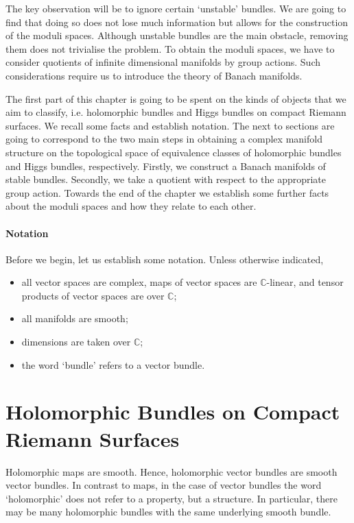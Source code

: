 \documentclass[12pt]{ociamthesis}  %
\begin{document}
The key observation will be to ignore certain `unstable' bundles. We
are going to find that doing so does not lose much information but
allows for the construction of the moduli spaces. Although unstable
bundles are the main obstacle, removing them does not trivialise the
problem. To obtain the moduli spaces, we have to consider quotients
of infinite dimensional manifolds by group actions. Such considerations
require us to introduce the theory of Banach manifolds.

The first part of this chapter is going to be spent on the kinds of
objects that we aim to classify, i.e. holomorphic bundles and Higgs
bundles on compact Riemann surfaces. We recall some facts and establish
notation. The next to sections are going to correspond to the two
main steps in obtaining a complex manifold structure on the topological
space of equivalence classes of holomorphic bundles and Higgs bundles,
respectively. Firstly, we construct a Banach manifolds of stable
bundles. Secondly, we take a quotient with respect to the appropriate
group action. Towards the end of the chapter we establish some
further facts about the moduli spaces and how they relate to each other.

\paragraph*{Notation}

Before we begin, let us establish some notation. Unless otherwise
indicated,

\begin{itemize}
  \item all vector spaces are complex, maps of vector spaces are
    $\mathbb{C}$-linear, and tensor products of vector spaces are
    over $\mathbb{C}$;
  \item all manifolds are smooth;
  \item dimensions are taken over $\mathbb{C}$;
  \item the word `bundle' refers to a vector bundle.
\end{itemize}

\section{Holomorphic Bundles on Compact Riemann Surfaces}

Holomorphic maps are smooth. Hence, holomorphic vector bundles
are smooth vector bundles. In contrast to maps, in the case of vector
bundles the word `holomorphic' does not refer to a property, but
a structure. In particular, there may be many holomorphic bundles with
the same underlying smooth bundle.
\end{document}

